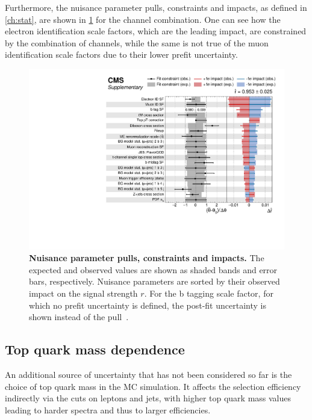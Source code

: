 Furthermore, the nuisance parameter pulls, constraints and impacts, as defined in \cref{ch:stat}, are shown in \cref{fig:ttxs:impacts} for the channel combination. One can see how the electron identification scale factors, which are the leading impact, are constrained by the combination of channels, while the same is not true of the muon identification scale factors due to their lower prefit uncertainty.

\begin{figure}[!ht]
    \centering
    \includegraphics[width=0.9\linewidth]{figures/ttxs/impacts_thesis.pdf}
    \caption{\textbf{Nuisance parameter pulls, constraints and impacts.} The expected and observed values are shown as shaded bands and error bars, respectively. Nuisance parameters are sorted by their observed impact on the signal strength $r$. For the b tagging scale factor, for which no prefit uncertainty is defined, the post-fit uncertainty is shown instead of the pull~\cite{CMS:TOP-22-012}.}
    \label{fig:ttxs:impacts}
\end{figure}



\subsection{Top quark mass dependence}
\label{sec:ttxs:topmass}

An additional source of uncertainty that has not been considered so far is the choice of top quark mass in the \ttbar MC simulation. It affects the selection efficiency indirectly via the \pt cuts on leptons and jets, with higher top quark mass values leading to harder spectra and thus to larger efficiencies.

